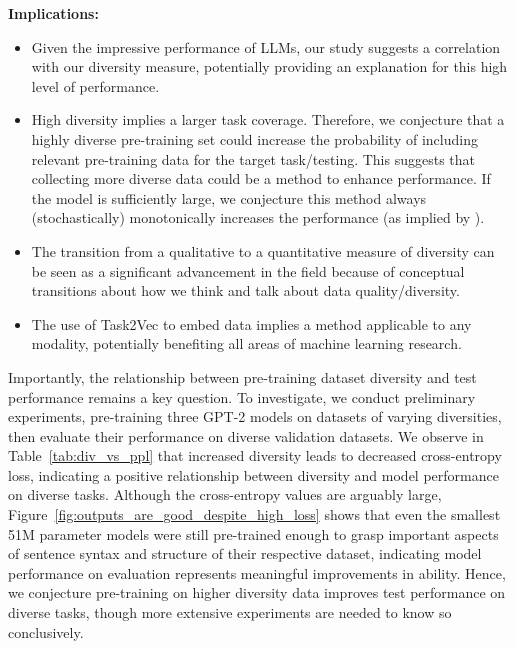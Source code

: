 \textbf{Implications:}
\begin{itemize}
    \item Given the impressive performance of LLMs, our study suggests a correlation with our diversity measure, potentially providing an explanation for this high level of performance.
    \item High diversity implies a larger task coverage. 
    Therefore, we conjecture that a highly diverse pre-training set could increase the probability of including relevant pre-training data for the target task/testing.
    This suggests that collecting more diverse data could be a method to enhance performance.
    If the model is sufficiently large, we conjecture this method always (stochastically) monotonically increases the performance (as implied by \citep{zhang2021understanding}).
    \item The transition from a qualitative to a quantitative measure of diversity can be seen as a significant advancement in the field because of conceptual transitions about how we think and talk about data quality/diversity.
    \item The use of Task2Vec to embed data implies a method applicable to any modality, potentially benefiting all areas of machine learning research.
\end{itemize}

Importantly, the relationship between pre-training dataset diversity and test performance remains a key question.
To investigate, we conduct preliminary experiments, pre-training three GPT-2 models on datasets of varying diversities, then evaluate their performance on diverse validation datasets.
We observe in Table~\ref{tab:div_vs_ppl} that increased diversity leads to decreased cross-entropy loss, indicating a positive relationship between diversity and model performance on diverse tasks. Although the cross-entropy values are arguably large, Figure~\ref{fig:outputs_are_good_despite_high_loss} shows that even the smallest 51M parameter models were still pre-trained enough to grasp important aspects of sentence syntax and structure of their respective dataset, indicating model performance on evaluation represents meaningful improvements in ability. 
Hence, we conjecture pre-training on higher diversity data improves test performance on diverse tasks, though more extensive experiments are needed to know so conclusively.

